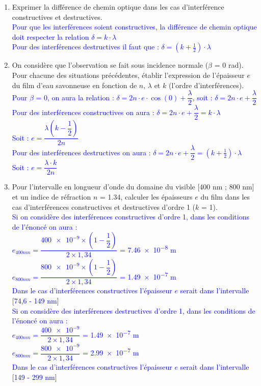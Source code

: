 \documentclass[a4paper,11pt,fleqn]{article}%
\begin{document}
    \begin{enumerate}
    \item Exprimer la différence de chemin optique dans les cas d'interférence constructives et destructives.\\
    \textcolor{blue}{Pour que les interférences soient constructives, la différence de chemin optique doit respecter la relation $\delta = k\cdot \lambda$\\
    Pour des interférences destructives il faut que : $\delta = (k+ \frac{1}{2})\cdot \lambda$}
    \item On considère que l'observation se fait sous incidence normale ($\beta$ = 0 \unit{\radian}). Pour chacune des situations précédentes, établir l'expression de l'épaisseur $e$ du film d'eau savonneuse en fonction de $n$, $\lambda$ et $k$ (l'ordre d'interférences).\\
    \textcolor{blue}{Pour $\beta$ = 0, on aura la relation : $\delta = 2 n \cdot e \cdot \cos(0) + \dfrac{\lambda}{2}$, soit  : $\delta = 2 n \cdot e + \dfrac{\lambda}{2}$\\
    Pour des interférences constructives on aura : $\delta = 2 n \cdot e + \dfrac{\lambda}{2} =k\cdot \lambda$\\
    Soit : $e=\dfrac{\lambda(k-\dfrac{1}{2})}{2n}$\\
    Pour des interférences destructives on aura : $\delta = 2 n \cdot e + \dfrac{\lambda}{2} =(k+\frac{1}{2})\cdot \lambda$\\
    Soit : $e=\dfrac{\lambda\cdot k}{2n}$}
    \item Pour l'intervalle en longueur d'onde du domaine du visible [\num{400} \unit{\nano\meter} ; \num{800} \unit{\nano\meter}] et un indice de réfraction $n$ = \num{1,34}, calculer les épaisseurs $e$ du film dans les cas d'interférences constructives et destructives d'ordre 1 ($k$ = 1).\\
    \textcolor{blue}{Si on considère des interférences constructives d'ordre 1, dans les conditions de l'énoncé on aura :\\
    $e_{400nm}=\dfrac{\num{400e-9}\times (1-\dfrac{1}{2})}{2\times 1,34}$ = \num{7,46e-8} \unit{\meter}\\
    $e_{800nm}=\dfrac{\num{800e-9}\times (1-\dfrac{1}{2})}{2\times 1,34}$ = \num{1,49e-7} \unit{\meter}\\
    Dans le cas d'interférences constructives l'épaisseur $e$ serait dans l'intervalle [74,6 - 149 nm]\\    
    Si on considère des interférences destructives d'ordre 1, dans les conditions de l'énoncé on aura :\\
    $e_{400nm}=\dfrac{\num{400e-9}}{2\times 1,34}$ = \num{1,49e-7} \unit{\meter}\\
    $e_{800nm}=\dfrac{\num{800e-9}}{2\times 1,34}$ = \num{2,99e-7} \unit{\meter}\\
    Dans le cas d'interférences constructives l'épaisseur $e$ serait dans l'intervalle [149 - 299 nm]\\}
    

\end{enumerate}
\end{document}
